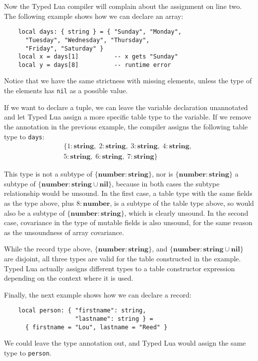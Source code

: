 \documentclass[preprint]{sig-alternate}
\newcommand{\Nil}{\mathbf{nil}}
\newcommand{\Number}{\mathbf{number}}
\newcommand{\String}{\mathbf{string}}
\begin{document}
Now the Typed Lua compiler will complain about the assignment
on line two. The following example shows how we can declare
an array:
\begin{verbatim}
    local days: { string } = { "Sunday", "Monday",
      "Tuesday", "Wednesday", "Thursday",
      "Friday", "Saturday" }
    local x = days[1]          -- x gets "Sunday"
    local y = days[8]          -- runtime error
\end{verbatim}

Notice that we have the same strictness with missing
elements, unless the type of the elements has {\tt nil}
as a possible value.

If we want to declare a tuple, we can leave the
variable declaration unannotated and let Typed Lua assign
a more specific table type to the variable.
If we remove the annotation in the previous example, 
the compiler assigns the following table type to \texttt{days}:
\begin{align*}
\{{1:\String},\;{2:\String},\;{3:\String},\;{4:\String},\;\\
{5:\String},\;{6:\String},\;{7:\String}\}
\end{align*}

This type is not a subtype of $\{\Number:\String\}$, nor
is $\{\Number:\String\}$ a subtype of $\{\Number:
\String\cup\Nil\}$, because in both cases the subtype
relationship would be unsound. In the first case,
a table type with the same fields as the type above,
plus $8: \Number$, is a subtype of the table type
above, so would also be a subtype of $\{\Number:\String\}$,
which is clearly unsound. In the second case, covariance
in the type of mutable fields is also unsound, for the
same reason as the unsoundness of array covariance.

While the record type above, $\{\Number:\String\}$, and
$\{\Number: \String\cup\Nil\}$ are disjoint, all three
types are valid for the table constructed in the example.
Typed Lua actually assigns different types to a table constructor
expression depending on the context where it is used.

Finally, the next example shows how we can declare a record:

\begin{verbatim}
    local person: { "firstname": string,
                    "lastname": string } =
      { firstname = "Lou", lastname = "Reed" } 
\end{verbatim}

We could leave the type annotation out, and Typed Lua would
assign the same type to {\tt person}.
\end{document}
